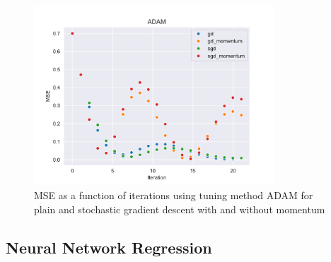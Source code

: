\begin{figure}[H]
\centering
\includegraphics[width=0.8\textwidth]{Figures/PartA/ADAMMSE(iter).pdf}
\caption{MSE as a function of iterations using tuning method ADAM for plain and stochastic gradient descent with and without momentum}
\label{fig:ADAMMSE-iter-pdf}
\end{figure}


\subsection{Neural Network Regression}

